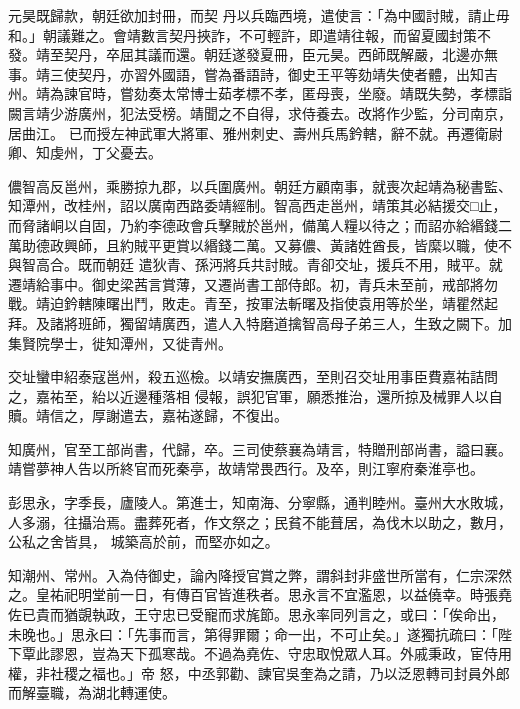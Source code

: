 \begin{pinyinscope}
 元昊既歸款，朝廷欲加封冊，而契
 丹以兵臨西境，遣使言：「為中國討賊，請止毋和。」朝議難之。會靖數言契丹挾詐，不可輕許，即遣靖往報，而留夏國封策不發。靖至契丹，卒屈其議而還。朝廷遂發夏冊，臣元昊。西師既解嚴，北邊亦無事。靖三使契丹，亦習外國語，嘗為番語詩，御史王平等劾靖失使者體，出知吉州。靖為諫官時，嘗劾奏太常博士茹孝標不孝，匿母喪，坐廢。靖既失勢，孝標詣闕言靖少游廣州，犯法受榜。靖聞之不自得，求侍養去。改將作少監，分司南京，居曲江。
 已而授左神武軍大將軍、雅州刺史、壽州兵馬鈐轄，辭不就。再遷衛尉卿、知虔州，丁父憂去。



 儂智高反邕州，乘勝掠九郡，以兵圍廣州。朝廷方顧南事，就喪次起靖為秘書監、知潭州，改桂州，詔以廣南西路委靖經制。智高西走邕州，靖策其必結援交□止，而脅諸峒以自固，乃約李德政會兵擊賊於邕州，備萬人糧以待之；而詔亦給緡錢二萬助德政興師，且約賊平更賞以緡錢二萬。又募儂、黃諸姓酋長，皆縻以職，使不與智高合。既而朝廷
 遣狄青、孫沔將兵共討賊。青卻交址，援兵不用，賊平。就遷靖給事中。御史梁茜言賞薄，又遷尚書工部侍郎。初，青兵未至前，戒部將勿戰。靖迫鈐轄陳曙出鬥，敗走。青至，按軍法斬曙及指使袁用等於坐，靖瞿然起拜。及諸將班師，獨留靖廣西，遣人入特磨道擒智高母子弟三人，生致之闕下。加集賢院學士，徙知潭州，又徙青州。



 交址蠻申紹泰寇邕州，殺五巡檢。以靖安撫廣西，至則召交址用事臣費嘉祐詰問之，嘉祐至，紿以近邊種落相
 侵報，誤犯官軍，願悉推治，還所掠及械罪人以自贖。靖信之，厚謝遣去，嘉祐遂歸，不復出。



 知廣州，官至工部尚書，代歸，卒。三司使蔡襄為靖言，特贈刑部尚書，謚曰襄。靖嘗夢神人告以所終官而死秦亭，故靖常畏西行。及卒，則江寧府秦淮亭也。



 彭思永，字季長，廬陵人。第進士，知南海、分寧縣，通判睦州。臺州大水敗城，人多溺，往攝治焉。盡葬死者，作文祭之；民貧不能葺居，為伐木以助之，數月，公私之舍皆具，
 城築高於前，而堅亦如之。



 知潮州、常州。入為侍御史，論內降授官賞之弊，謂斜封非盛世所當有，仁宗深然之。皇祐祀明堂前一日，有傳百官皆進秩者。思永言不宜濫恩，以益僥幸。時張堯佐已貴而猶覬執政，王守忠已受寵而求旄節。思永率同列言之，或曰：「俟命出，未晚也。」思永曰：「先事而言，第得罪爾；命一出，不可止矣。」遂獨抗疏曰：「陛下覃此謬恩，豈為天下孤寒哉。不過為堯佐、守忠取悅眾人耳。外戚秉政，宦侍用權，非社稷之福也。」帝
 怒，中丞郭勸、諫官吳奎為之請，乃以泛恩轉司封員外郎而解臺職，為湖北轉運使。




\end{pinyinscope}
